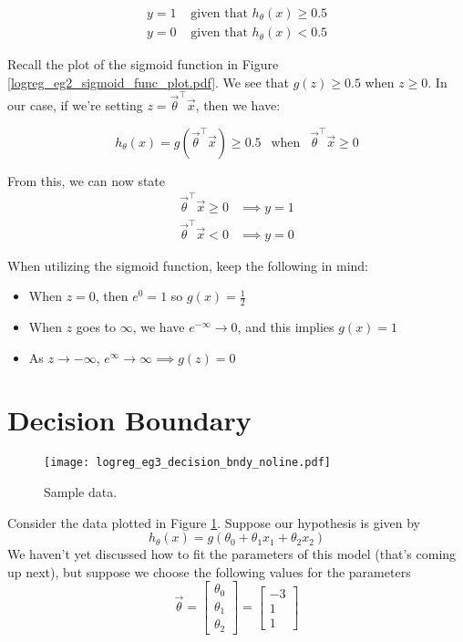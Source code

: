 \begin{align}
y  = 1 &\text{ given that } h_\theta\left(x\right) \geq 0.5 \\
y = 0 &\text{ given that } h_\theta\left(x\right) < 0.5
\end{align}

Recall the plot of the sigmoid function in Figure \ref{logreg_eg2_sigmoid_func_plot.pdf}. We see that $g\left(z\right) \geq 0.5$ when $z \geq 0$. In our case, if we're setting $z = \vec{\theta}^\intercal \vec{x}$, then we have:

\begin{equation}
h_\theta\left(x\right) = g\left(\vec{\theta}^\intercal\vec{x}\right) \geq 0.5 ~~\mbox{ when }~~ \vec{\theta}^\intercal\vec{x} \geq 0
\end{equation}

\noindent From this, we can now state
\begin{align}
\vec{\theta}^\intercal\vec{x} \geq 0 &\implies y = 1 \\
\vec{\theta}^\intercal\vec{x} < 0 &\implies y= 0
\end{align}

\noindent When utilizing the sigmoid function, keep the following in mind:
\begin{itemize}
\item When $z = 0$, then $e^0 = 1$ so $g\left(x\right) = \frac{1}{2}$
\item When $z$ goes to $\infty$, we have $e^{-\infty} \to 0$, and this implies $g\left(x\right) = 1$
\item As $z \to -\infty$, $e^\infty \to \infty \implies g\left(z\right) = 0$
\end{itemize}


\section{Decision Boundary}
\begin{figure}[h] %
	\centering
	\graphicspath{{./Figures/}} %
	\texttt{[image: logreg\_eg3\_decision\_bndy\_noline.pdf]} 
	\caption[]{Sample data.}
	\label{logreg_eg3_decision_bndy_noline.pdf}
\end{figure}

Consider the data plotted in Figure \ref{logreg_eg3_decision_bndy_noline.pdf}. Suppose our hypothesis is given by
$$
h_\theta\left(x\right) = g\left(\theta_0 + \theta_1x_1 + \theta_2x_2\right)
$$
We haven't yet discussed how to fit the parameters of this model (that's coming up next), but suppose we choose the following values for the parameters
$$
\vec{\theta} = \left[\begin{array}{c}\theta_0 \\ \theta_1 \\ \theta_2\end{array}\right] = \left[\begin{array}{c} -3 \\ 1 \\ 1 \end{array}\right]
$$

